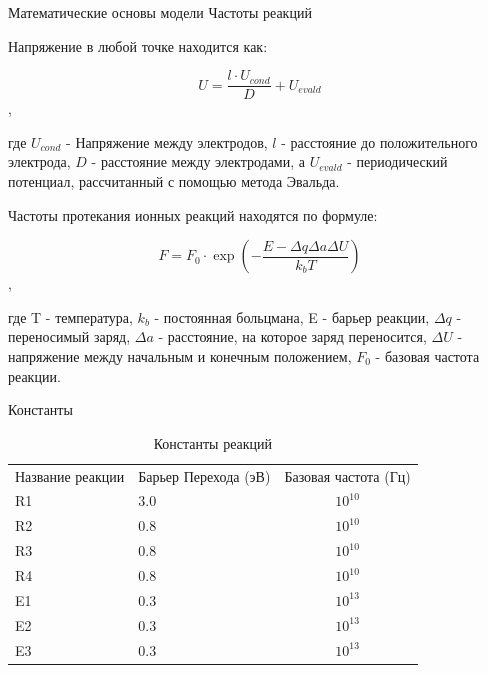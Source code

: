 \documentclass{beamer}%
\begin{document}

\begin{frame}{Математические основы модели} {Частоты реакций}

    \small

    Напряжение в любой точке находится как:

    \[U = \frac{l\cdot U_{cond}}{D}+U_{evald}\],

    где \(U_{cond}\) - Напряжение между электродов, \(l\) - расстояние до положительного электрода, \(D\) - расстояние между электродами, а \(U_{evald}\) - периодический потенциал, рассчитанный с помощью метода Эвальда.

    Частоты протекания ионных реакций находятся по формуле:

    \[F = F_0 \cdot \exp{(-\frac{E-\Delta q \Delta a \Delta U}{k_bT})}\],

    где T - температура, \(k_b\) - постоянная больцмана, E - барьер реакции, \(\Delta q\) - переносимый заряд, \(\Delta a\) - расстояние, на которое заряд переносится, \(\Delta U\) - напряжение между начальным и конечным положением, \(F_0\)  - базовая частота реакции.
    

    
\end{frame}


\begin{frame}{Константы}

      \begin{table}
        \begin{tabular}{llc}
          Название реакции & Барьер Перехода (эВ) & Базовая частота (Гц)\\ 
          R1 &  \(3.0\) &  \(10^{10}\)\\
          R2 &  \(0.8\) &  \(10^{10}\)\\
          R3 &  \(0.8\) &  \(10^{10}\)\\
          R4 &  \(0.8\) &  \(10^{10}\)\\
          E1 &  \(0.3\) &  \(10^{13}\)\\
          E2 &  \(0.3\) &  \(10^{13}\)\\
          E3 &  \(0.3\) &  \(10^{13}\)\\
        \end{tabular}
        \caption{Константы реакций}
      \end{table}


\end{frame}
\end{document}
